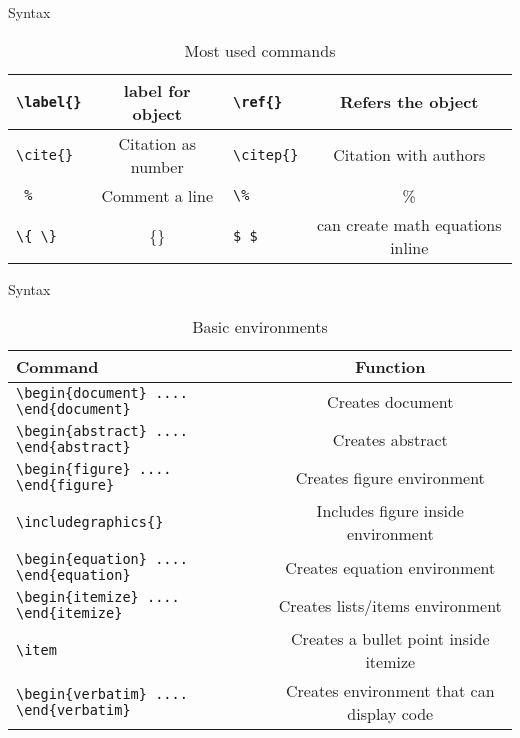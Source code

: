 \begin{frame}{Syntax}
\begin{table}[]
\begin{footnotesize}
\begin{tabular}{|l|c|l|c|}
     \hline
     \texttt{\textbackslash label\{\}} & label for object & \texttt{\textbackslash ref\{\}} & Refers the object\\
     \hline
     \texttt{\textbackslash cite\{\}} & Citation as number & \texttt{\textbackslash citep\{\}} & Citation with authors\\
     \hline
      \texttt{ \%} & Comment a line & \texttt{\textbackslash \%} & \%\\
     \hline
      \texttt{\textbackslash \{ \textbackslash\}} & \{\} & \texttt{\$ \$}  & can create math equations inline\\
     \hline
    \end{tabular}
    \end{footnotesize}
    \caption{Most used commands}
    \label{tab:syntax01}
\end{table}

\end{frame}
\begin{frame}{Syntax}
\begin{table}[]
    \centering
    \begin{footnotesize}
    \begin{tabular}{|l|c|}
    \hline
     Command & Function \\
      \hline
     \texttt{\textbackslash begin\{document\} .... \textbackslash end\{document\}} & Creates document\\
     \hline
     \texttt{\textbackslash begin\{abstract\} .... \textbackslash end\{abstract\}} & Creates abstract\\
     \hline
      \texttt{\textbackslash begin\{figure\} .... \textbackslash end\{figure\}} & Creates figure environment\\
     \hline
     \texttt{\textbackslash includegraphics\{\}} & Includes figure inside environment\\
     \hline
     \texttt{\textbackslash begin\{equation\} .... \textbackslash end\{equation\}} & Creates equation environment\\
     \hline
     \texttt{\textbackslash begin\{itemize\} .... \textbackslash end\{itemize\}} & Creates lists/items environment\\
     \hline
     \texttt{\textbackslash item} & Creates a bullet point inside itemize\\
     \hline
     \texttt{\textbackslash begin\{verbatim\} .... \textbackslash end\{verbatim\}} & Creates environment that can display code\\
     \hline
    \end{tabular}
    \end{footnotesize}
    \caption{Basic environments}
    \label{tab:syntax02}
\end{table}

\end{frame}
